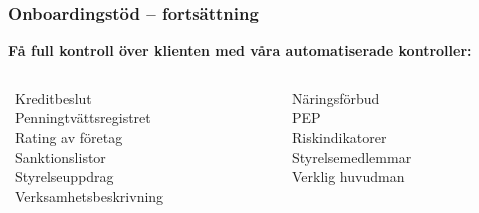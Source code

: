 \documentclass[10pt]{beamer}
\begin{document}
\begin{frame}[plain]
  \frametitle{Onboardingstöd – fortsättning}
  \footnotesize
  \begin{minipage}{0.92\textwidth}
    \textbf{Få full kontroll över klienten med våra automatiserade kontroller:}
    \medskip
    \begin{columns}[T]
      \begin{column}{0.48\textwidth}
        \textbullet\ Kreditbeslut \\
        \textbullet\ Penningtvättsregistret \\
        \textbullet\ Rating av företag \\
        \textbullet\ Sanktionslistor \\
        \textbullet\ Styrelseuppdrag \\
        \textbullet\ Verksamhetsbeskrivning
      \end{column}
      \begin{column}{0.48\textwidth}
        \textbullet\ Näringsförbud \\
        \textbullet\ PEP \\
        \textbullet\ Riskindikatorer \\
        \textbullet\ Styrelsemedlemmar \\
        \textbullet\ Verklig huvudman
      \end{column}
    \end{columns}
  \end{minipage}
\end{frame}

\end{document}
